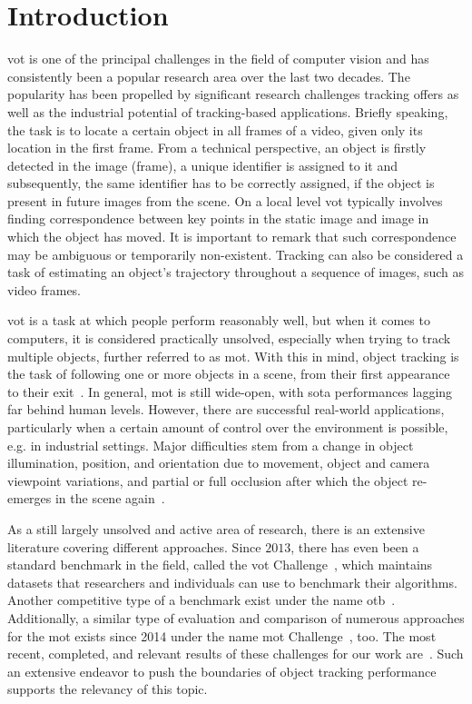 \chapter{Introduction}
\label{chap:Introduction}

\Gls{vot} is one of the principal challenges in the field of computer vision and has consistently been a popular research area over the last two decades. The popularity has been propelled by significant research challenges tracking offers as well as the industrial potential of tracking-based applications. Briefly speaking, the task is to locate a certain object in all frames of a video, given only its location in the first frame. From a technical perspective, an object is firstly detected in the image (frame), a unique identifier is assigned to it and subsequently, the same identifier has to be correctly assigned, if the object is present in future images from the scene. On a local level \gls{vot} typically involves finding correspondence between key points in the static image and image in which the object has moved. It is important to remark that such correspondence may be ambiguous or temporarily non-existent. Tracking can also be considered a task of estimating an object’s trajectory throughout a sequence of images, such as video frames.

\Gls{vot} is a task at which people perform reasonably well, but when it comes to computers, it is considered practically unsolved, especially when trying to track multiple objects, further referred to as \gls{mot}. With this in mind, object tracking is the task of following one or more objects in a scene, from their first appearance to their exit~\cite{forsyth2012computer}. In general, \gls{mot} is still wide-open, with \gls{sota} performances lagging far behind human levels. However, there are successful real-world applications, particularly when a certain amount of control over the environment is possible, e.g. in industrial settings. Major difficulties stem from a change in object illumination, position, and orientation due to movement, object and camera viewpoint variations, and partial or full occlusion after which the object re-emerges in the scene again~\cite{jalal2012sotavot}.

As a still largely unsolved and active area of research, there is an extensive literature covering different approaches. Since $2013$, there has even been a standard benchmark in the field, called the \gls{vot} Challenge~\cite{webvotchallenge}, which maintains datasets that researchers and individuals can use to benchmark their algorithms. Another competitive type of a benchmark exist under the name \gls{otb}~\cite{wu2015otb}. Additionally, a similar type of evaluation and comparison of numerous approaches for the \gls{mot} exists since 2014 under the name \gls{mot} Challenge~\cite{webmotchallenge}, too. The most recent, completed, and relevant results of these challenges for our work are~\cite{kristan2018vot18, kristan2019motyolovot19, dendorfer2019cvpr}. Such an extensive endeavor to push the boundaries of object tracking performance supports the relevancy of this topic.

